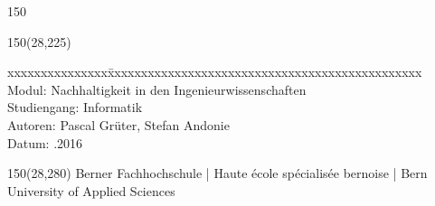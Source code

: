 \begin{titlepage}
\begin{flushleft}
\begin{textblock}{150}
\end{textblock}

\begin{textblock}{150}(28,225)
\fontsize{10pt}{17pt}\selectfont
\begin{tabbing}
xxxxxxxxxxxxxxx\=xxxxxxxxxxxxxxxxxxxxxxxxxxxxxxxxxxxxxxxxxxxxxxx \kill
Modul:	\> Nachhaltigkeit in den Ingenieurwissenschaften	\\			%
Studiengang:	\> Informatik	\\			%
Autoren:		\> Pascal Grüter, Stefan Andonie		\\					%
Datum:			.2016					\\		
\end{tabbing}

\end{textblock}
\end{flushleft}

\begin{textblock}{150}(28,280)
\noindent 
\color{bfhgrey}\fontsize{9pt}{10pt}\selectfont
Berner Fachhochschule | Haute école spécialisée bernoise | Bern University of Applied Sciences
\color{black}\selectfont
\end{textblock}


\end{titlepage}

%
%
